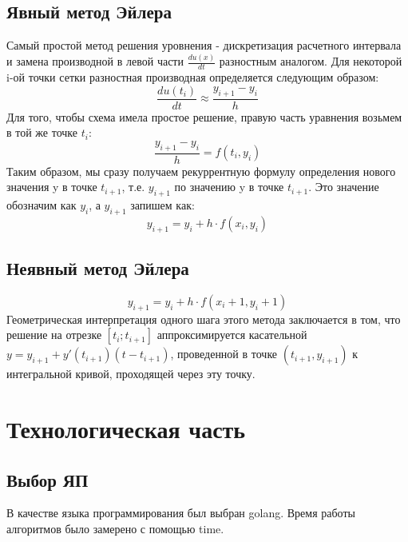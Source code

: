 \documentclass[12pt]{report}
\begin{document}
\section{Явный метод Эйлера}
Самый простой метод решения уровнения - дискретизация расчетного интервала и замена производной в левой части $\frac{du(x)}{dt}$	разностным аналогом. Для некоторой i-ой точки сетки разностная производная определяется следующим образом:
\begin{equation}
\frac{du(t_i)}{dt} \approx \frac{y_{i+1} - y_i}{h}
\end{equation}
Для того, чтобы схема имела простое решение, правую часть уравнения возьмем в той же точке $t_i$:
\begin{equation}
\frac{y_{i+1} - y_i}{h} = f(t_i, y_i)
\end{equation}
Таким образом, мы сразу получаем рекуррентную формулу определения нового значения y в точке $t_{i+1}$, т.е. $y_{i+1}$ по значению y в точке $t_{i+1}$. Это значение обозначим как $y_{i}$, а $y_{i+1}$ запишем как:
\begin{equation}
y_{i+1} = y_i + h \cdot f(x_i,y_i)
\end{equation}
\section{Неявный метод Эйлера}
\begin{equation}
y_{i+1} = y_i + h \cdot f(x_i+1,y_i+1)
\end{equation}
Геометрическая интерпретация  одного шага этого метода заключается в том, что решение на отрезке $[t_i;t_{i+1}]$ аппроксимируется касательной $y = y_{i+1} + y'(t_{i+1})(t-t_{i+1})$, проведенной в точке $(t_{i+1},y_{i+1})$ к интегральной кривой, проходящей через эту точку.
\chapter{Технологическая часть}

\section{Выбор ЯП}
В качестве языка программирования был выбран golang.
Время работы алгоритмов было замерено с помощью time. 
\end{document}
